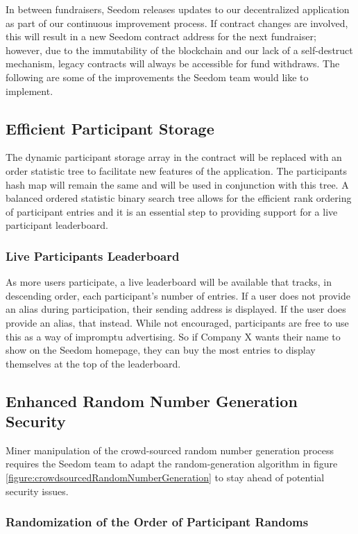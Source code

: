 \documentclass[11pt]{article}
\begin{document}
In between fundraisers, Seedom releases updates to our decentralized application as part of our continuous improvement process. If contract changes are involved, this will result in a new Seedom contract address for the next fundraiser; however, due to the immutability of the blockchain and our lack of a self-destruct mechanism, legacy contracts will always be accessible for fund withdraws. The following are some of the improvements the Seedom team would like to implement.

\subsection{Efficient Participant Storage}

The dynamic participant storage array in the contract will be replaced with an order statistic tree \cite{5} to facilitate new features of the application. The participants hash map will remain the same and will be used in conjunction with this tree. A balanced ordered statistic binary search tree allows for the efficient rank ordering of participant entries and it is an essential step to providing support for a live participant leaderboard.

\subsubsection{Live Participants Leaderboard}

As more users participate, a live leaderboard will be available that tracks, in descending order, each participant's number of entries. If a user does not provide an alias during participation, their sending address is displayed. If the user does provide an alias, that instead. While not encouraged, participants are free to use this as a way of impromptu advertising. So if Company X wants their name to show on the Seedom homepage, they can buy the most entries to display themselves at the top of the leaderboard.

\subsection{Enhanced Random Number Generation Security}

Miner manipulation of the crowd-sourced random number generation process requires the Seedom team to adapt the random-generation algorithm in figure \ref{figure:crowdsourcedRandomNumberGeneration} to stay ahead of potential security issues.

\subsubsection{Randomization of the Order of Participant Randoms}
\end{document}
